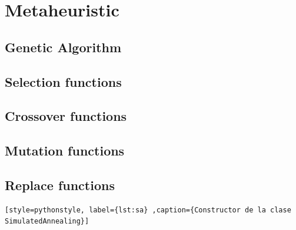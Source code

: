\section{Metaheuristic}

\subsection{Genetic Algorithm}

\subsection{Selection functions}

\subsection{Crossover functions}

\subsection{Mutation functions}

\subsection{Replace functions}

\begin{lstlisting}[style=pythonstyle, label={lst:sa} ,caption={Constructor de la clase SimulatedAnnealing}]
\end{lstlisting}

